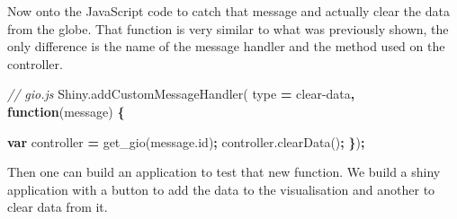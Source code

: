\documentclass[
]{krantz}
\makeatletter
\newenvironment{Shaded}{\begin{snugshade}}{\end{snugshade}}
\newcommand{\AttributeTok}[1]{\textcolor[rgb]{0.61,0.61,0.61}{#1}}
\newcommand{\CommentTok}[1]{\textcolor[rgb]{0.37,0.37,0.37}{\textit{#1}}}
\newcommand{\KeywordTok}[1]{\textcolor[rgb]{0.27,0.27,0.27}{\textbf{#1}}}
\newcommand{\NormalTok}[1]{#1}
\newcommand{\OperatorTok}[1]{\textcolor[rgb]{0.43,0.43,0.43}{\textbf{#1}}}
\newcommand{\StringTok}[1]{\textcolor[rgb]{0.5,0.5,0.5}{#1}}
\newcommand{\VariableTok}[1]{\textcolor[rgb]{0,0,0}{#1}}
\newenvironment{kframe}{%
\medskip{}
\setlength{\fboxsep}{.8em}
 \def\at@end@of@kframe{}%
 \ifinner\ifhmode%
  \def\at@end@of@kframe{\end{minipage}}%
  \begin{minipage}{\columnwidth}%
 \fi\fi%
 \def\FrameCommand##1{\hskip\@totalleftmargin \hskip-\fboxsep
 \colorbox{shadecolor}{##1}\hskip-\fboxsep
     \hskip-\linewidth \hskip-\@totalleftmargin \hskip\columnwidth}%
 \MakeFramed {\advance\hsize-\width
   \@totalleftmargin\z@ \linewidth\hsize
   \@setminipage}}%
 {\par\unskip\endMakeFramed%
 \at@end@of@kframe}
\renewenvironment{Shaded}{\begin{kframe}}{\end{kframe}}
\makeatother
\begin{document}
Now onto the JavaScript code to catch that message and actually clear the data from the globe. That function is very similar to what was previously shown, the only difference is the name of the message handler and the method used on the controller.

\begin{Shaded}
\begin{Highlighting}[]
\CommentTok{// gio.js}
\VariableTok{Shiny}\NormalTok{.}\AttributeTok{addCustomMessageHandler}\NormalTok{(}
\NormalTok{  type }\OperatorTok{=} \StringTok{\textquotesingle{}clear{-}data\textquotesingle{}}\OperatorTok{,} \KeywordTok{function}\NormalTok{(message) }\OperatorTok{\{}

    \KeywordTok{var}\NormalTok{ controller }\OperatorTok{=} \AttributeTok{get\_gio}\NormalTok{(}\VariableTok{message}\NormalTok{.}\AttributeTok{id}\NormalTok{)}\OperatorTok{;}
    \VariableTok{controller}\NormalTok{.}\AttributeTok{clearData}\NormalTok{()}\OperatorTok{;}
\OperatorTok{\}}\NormalTok{)}\OperatorTok{;}
\end{Highlighting}
\end{Shaded}

Then one can build an application to test that new function. We build a shiny application with a button to add the data to the visualisation and another to clear data from it.
\end{document}
